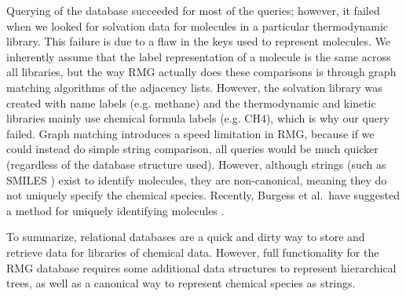 \documentclass[11pt]{article}
\begin{document}
Querying of the database succeeded for most of the queries; however, it failed when we looked for solvation data for molecules in a particular thermodynamic library. This failure is due to a flaw in the keys used to represent molecules. We inherently assume that the label representation of a molecule is the same across all libraries, but the way RMG actually does these comparisons is through graph matching algorithms of the adjacency lists. However, the solvation library was created with name labels (e.g. methane) and the thermodynamic and kinetic libraries mainly use chemical formula labels (e.g. CH4), which is why our query failed. Graph matching introduces a speed limitation in RMG, because if we could instead do simple string comparison, all queries would be much quicker (regardless of the database structure used). However, although strings (such as SMILES \cite{Weininger1988}) exist to identify molecules, they are non-canonical, meaning they do not uniquely specify the chemical species. Recently, Burgess et al.~have suggested a method for uniquely identifying molecules \cite{Burgess2014}.

To summarize, relational databases are a quick and dirty way to store and retrieve data for libraries of chemical data. However, full functionality for the RMG database requires some additional data structures to represent hierarchical trees, as well as a canonical way to represent chemical species as strings.



\end{document}
